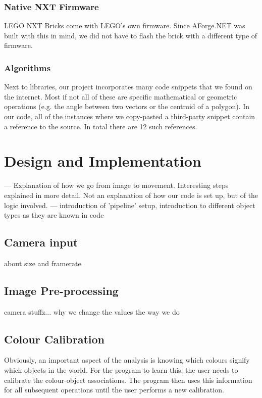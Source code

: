 \documentclass[10pt,twocolumn]{scrartcl}
\begin{document}
\subsubsection{Native NXT Firmware}
LEGO NXT Bricks come with LEGO's own firmware. Since AForge.NET was built with this in mind, we did not have to flash the brick with a different type of firmware.

\subsubsection{Algorithms}
Next to libraries, our project incorporates many code snippets that we found on the internet. Most if not all of these are specific mathematical or geometric operations (e.g. the angle between two vectors or the centroid of a polygon). In our code, all of the instances where we copy-pasted a third-party snippet contain a reference to the source. In total there are 12 such references.

\section{Design and Implementation}
--- Explanation of how we go from image to movement. Interesting steps explained in more detail. Not an explanation of how our code is set up, but of the logic involved. ---
introduction of 'pipeline' setup, introduction to different object types as they are known in code

\subsection{Camera input}
about size and framerate

\subsection{Image Pre-processing}
camera stuffz... why we change the values the way we do

\subsection{Colour Calibration}
Obviously, an important aspect of the analysis is knowing which colours signify which objects in the world. For the program to learn this, the user needs to calibrate the colour-object associations. The program then uses this information for all subsequent operations until the user performs a new calibration.
\end{document}
